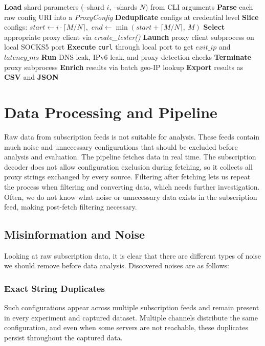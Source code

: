 \documentclass[10pt,conference]{IEEEtran}
\begin{document}
\begin{algorithm}[t]
\caption{Containerized Environment Lifecycle}
\label{alg:container}
\begin{algorithmic}[1]
    \State \textbf{Load} shard parameters (--shard $i$, --shards $N$) from CLI arguments
    \State \textbf{Parse} each raw config URI into a \textit{ProxyConfig}
    \State \textbf{Deduplicate} configs at credential level
    \State \textbf{Slice} configs: $start \leftarrow i \cdot \lceil M/N \rceil$,\ $end \leftarrow \min(start + \lceil M/N \rceil,\ M)$
        \State \textbf{Select} appropriate proxy client via \textit{create\_tester()}
        \State \textbf{Launch} proxy client subprocess on local SOCKS5 port
        \State \textbf{Execute} \texttt{curl} through local port to get $exit\_ip$ and $latency\_ms$
            \State \textbf{Run} DNS leak, IPv6 leak, and proxy detection checks
        \EndIf
        \State \textbf{Terminate} proxy subprocess
    \EndFor
    \State \textbf{Enrich} results via batch geo-IP lookup
    \State \textbf{Export} results as \textbf{CSV} and \textbf{JSON}
\end{algorithmic}
\end{algorithm}

\section{Data Processing and Pipeline}
Raw data from subscription feeds is not suitable for analysis.
These feeds contain much noise and unnecessary configurations that should be excluded before analysis and evaluation.
The pipeline fetches data in real time.
The subscription decoder does not allow configuration exclusion during fetching, so it collects all proxy strings exchanged by every source.
Filtering after fetching lets us repeat the process when filtering and converting data, which needs further investigation.
Often, we do not know what noise or unnecessary data exists in the subscription feed, making post-fetch filtering necessary.

\subsection{Misinformation and Noise}
Looking at raw subscription data, it is clear that there are different types of noise we should remove before data analysis.
Discovered noises are as follows:

\subsubsection{Exact String Duplicates}
Such configurations appear across multiple subscription feeds and remain present in every experiment and captured dataset.
Multiple channels distribute the same configuration, and even when some servers are not reachable, these duplicates persist throughout the captured data.
\end{document}
